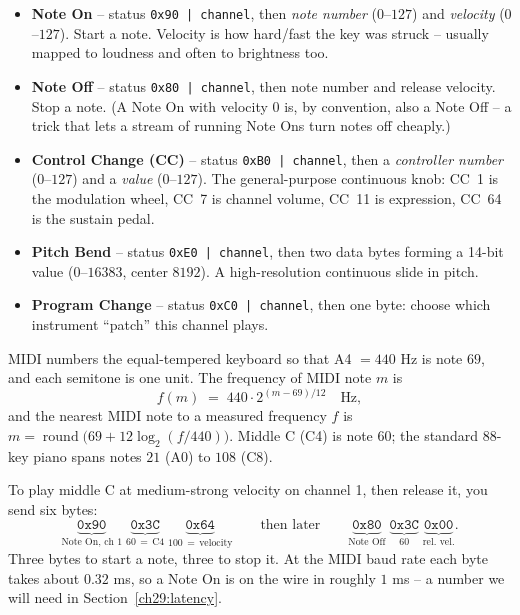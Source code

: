 \begin{itemize}
  \item \textbf{Note On} -- status \texttt{0x90 | channel}, then \emph{note number} ($0$--$127$) and
    \emph{velocity} ($0$--$127$). Start a note. Velocity is how hard/fast the key was struck -- usually
    mapped to loudness and often to brightness too.
  \item \textbf{Note Off} -- status \texttt{0x80 | channel}, then note number and release velocity.
    Stop a note. (A Note On with velocity $0$ is, by convention, also a Note Off -- a trick that lets
    a stream of running Note Ons turn notes off cheaply.)
  \item \textbf{Control Change (CC)} -- status \texttt{0xB0 | channel}, then a \emph{controller
    number} ($0$--$127$) and a \emph{value} ($0$--$127$). The general-purpose continuous knob: CC~1 is
    the modulation wheel, CC~7 is channel volume, CC~11 is expression, CC~64 is the sustain pedal.
  \item \textbf{Pitch Bend} -- status \texttt{0xE0 | channel}, then two data bytes forming a 14-bit
    value ($0$--$16383$, center $8192$). A high-resolution continuous slide in pitch.
  \item \textbf{Program Change} -- status \texttt{0xC0 | channel}, then one byte: choose which
    instrument ``patch'' this channel plays.
\end{itemize}

\begin{definition}
\label{ch29:def-midinote}
MIDI numbers the equal-tempered keyboard so that A4 $= 440$ Hz is note $69$, and each semitone is one
unit. The frequency of MIDI note $m$ is
\[
  f(m) \;=\; 440 \cdot 2^{(m-69)/12} \quad\text{Hz},
\]
and the nearest MIDI note to a measured frequency $f$ is $m = \operatorname{round}\!\big(69 +
12\log_2(f/440)\big)$. Middle C (C4) is note $60$; the standard 88-key piano spans notes $21$ (A0) to
$108$ (C8).
\end{definition}

\begin{example}
\label{ch29:ex-bytes}
To play middle C at medium-strong velocity on channel 1, then release it, you send six bytes:
\[
  \underbrace{\texttt{0x90}}_{\text{Note On, ch 1}}\;
  \underbrace{\texttt{0x3C}}_{60\,=\,\text{C4}}\;
  \underbrace{\texttt{0x64}}_{100\,=\,\text{velocity}}
  \qquad\text{then later}\qquad
  \underbrace{\texttt{0x80}}_{\text{Note Off}}\;
  \underbrace{\texttt{0x3C}}_{60}\;
  \underbrace{\texttt{0x00}}_{\text{rel. vel.}}.
\]
Three bytes to start a note, three to stop it. At the MIDI baud rate each byte takes about $0.32$ ms,
so a Note On is on the wire in roughly $1$ ms -- a number we will need in
Section~\ref{ch29:latency}.
\end{example}

